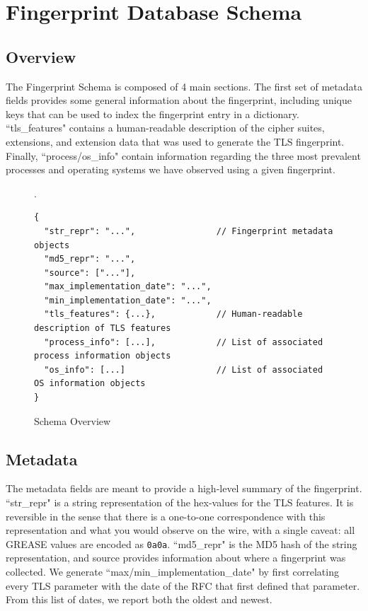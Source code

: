 \documentclass{book}
\begin{document}
\chapter{Fingerprint Database Schema}
\label{chapter:schema}

\section{Overview}

The Fingerprint Schema is composed of 4 main sections. The first set of metadata fields provides some general information about the fingerprint, including unique keys that can be used to index the fingerprint entry in a dictionary. ``tls\_features" contains a human-readable description of the cipher suites, extensions, and extension data that was used to generate the TLS fingerprint. Finally, ``process/os\_info" contain information regarding the three most prevalent processes and operating systems we have observed using a given fingerprint.

\begin{figure}[H]\small
  \caption{Schema Overview}
  \label{figure:schema-overview}.
\begin{verbatim}
{
  "str_repr": "...",                // Fingerprint metadata objects
  "md5_repr": "...",
  "source": ["..."],
  "max_implementation_date": "...", 
  "min_implementation_date": "...",
  "tls_features": {...},            // Human-readable description of TLS features
  "process_info": [...],            // List of associated process information objects
  "os_info": [...]                  // List of associated OS information objects
}
\end{verbatim}
\end{figure}


\section{Metadata}

The metadata fields are meant to provide a high-level summary of the fingerprint. ``str\_repr" is a string representation of the hex-values for the TLS features. It is reversible in the sense that there is a one-to-one correspondence with this representation and what you would observe on the wire, with a single caveat: all GREASE values are encoded as \texttt{0a0a}. ``md5\_repr" is the MD5 hash of the string representation, and source provides information about where a fingerprint was collected. We generate ``max/min\_implementation\_date" by first correlating every TLS parameter with the date of the RFC that first defined that parameter. From this list of dates, we report both the oldest and newest.
\end{document}
